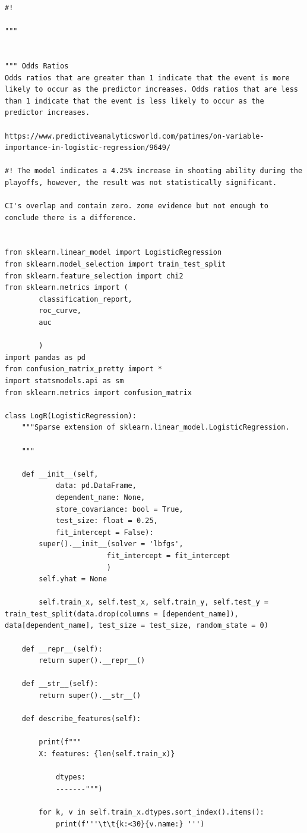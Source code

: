 \begin{verbatim}
#!

"""


""" Odds Ratios
Odds ratios that are greater than 1 indicate that the event is more likely to occur as the predictor increases. Odds ratios that are less than 1 indicate that the event is less likely to occur as the predictor increases.

https://www.predictiveanalyticsworld.com/patimes/on-variable-importance-in-logistic-regression/9649/

#! The model indicates a 4.25% increase in shooting ability during the playoffs, however, the result was not statistically significant.

CI's overlap and contain zero. zome evidence but not enough to conclude there is a difference.


from sklearn.linear_model import LogisticRegression
from sklearn.model_selection import train_test_split
from sklearn.feature_selection import chi2
from sklearn.metrics import (
        classification_report,
        roc_curve,
        auc

        )
import pandas as pd
from confusion_matrix_pretty import *
import statsmodels.api as sm
from sklearn.metrics import confusion_matrix

class LogR(LogisticRegression):
    """Sparse extension of sklearn.linear_model.LogisticRegression.

    """

    def __init__(self,
            data: pd.DataFrame,
            dependent_name: None,
            store_covariance: bool = True,
            test_size: float = 0.25,
            fit_intercept = False):
        super().__init__(solver = 'lbfgs',
                        fit_intercept = fit_intercept
                        )
        self.yhat = None

        self.train_x, self.test_x, self.train_y, self.test_y = train_test_split(data.drop(columns = [dependent_name]), data[dependent_name], test_size = test_size, random_state = 0)

    def __repr__(self):
        return super().__repr__()

    def __str__(self):
        return super().__str__()

    def describe_features(self):

        print(f"""
        X: features: {len(self.train_x)}

            dtypes:
            -------""")

        for k, v in self.train_x.dtypes.sort_index().items():
            print(f'''\t\t{k:<30}{v.name:} ''')


\end{verbatim}
